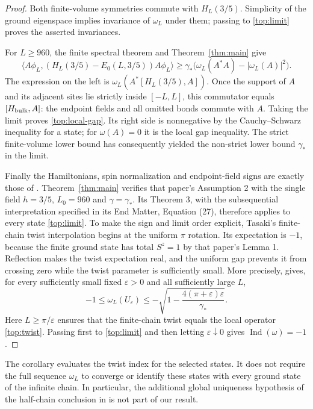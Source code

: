 \documentclass[11pt]{article}
\theoremstyle{remark}
\numberwithin{equation}{section}
\begin{document}
\begin{proof}
Both finite-volume symmetries commute with $H_L(3/5)$. Simplicity of
the ground eigenspace implies invariance of $\omega_L$ under them;
passing to \eqref{top:limit} proves the asserted invariances.

For $L\ge960$, the finite spectral theorem and Theorem~\ref{thm:main}
give
\[
 \langle A\phi_L,(H_L(3/5)-E_0(L,3/5))A\phi_L\rangle
 \ge\gamma_*\bigl(\omega_L(A^*A)-|\omega_L(A)|^2\bigr).
\]
The expression on the left is
$\omega_L(A^*[H_L(3/5),A])$. Once the support of $A$ and its adjacent
sites lie strictly inside $[-L,L]$, this commutator equals
$[H_{\rm bulk},A]$: the endpoint fields and all omitted bonds commute
with $A$. Taking the limit proves \eqref{top:local-gap}. Its right
side is nonnegative by the Cauchy--Schwarz inequality for a state;
for $\omega(A)=0$ it is the local gap inequality. The strict
finite-volume lower bound has consequently yielded the non-strict
lower bound $\gamma_*$ in the limit.

Finally the Hamiltonians, spin normalization and endpoint-field signs
are exactly those of \cite[Equation (2)]{Tasaki2025}. Theorem~\ref{thm:main}
verifies that paper's Assumption 2 with the single field $h=3/5$,
$L_0=960$ and $\gamma=\gamma_*$. Its Theorem 3, with the subsequential
interpretation specified in its End Matter, Equation (27), therefore
applies to every state \eqref{top:limit}. To make the sign and limit
order explicit, Tasaki's finite-chain twist interpolation begins at
the uniform $\pi$ rotation. Its expectation is $-1$, because the
finite ground state has total $S^z=1$ by that paper's Lemma 1.
Reflection makes the twist expectation real, and the uniform gap
prevents it from crossing zero while the twist parameter is sufficiently
small. More precisely,
\cite[Lemmas 6--8 and Equations (17)--(18)]{Tasaki2025} gives, for
every sufficiently small fixed $\varepsilon>0$ and all sufficiently
large $L$,
\[
 -1\le\omega_L(U_\varepsilon)
 \le-\sqrt{1-\frac{4(\pi+\varepsilon)\varepsilon}{\gamma_*}}.
\]
Here $L\ge\pi/\varepsilon$ ensures that the finite-chain twist equals
the local operator \eqref{top:twist}. Passing first to
\eqref{top:limit} and then letting $\varepsilon\downarrow0$ gives
$\operatorname{Ind}(\omega)=-1$.
\end{proof}

The corollary evaluates the twist index for the selected states. It does
not require the full sequence $\omega_L$ to converge or identify these
states with every ground state of the infinite chain. In particular,
the additional global uniqueness hypothesis of the half-chain conclusion
in \cite[Corollary 4]{Tasaki2025} is not part of our result.
\end{document}
